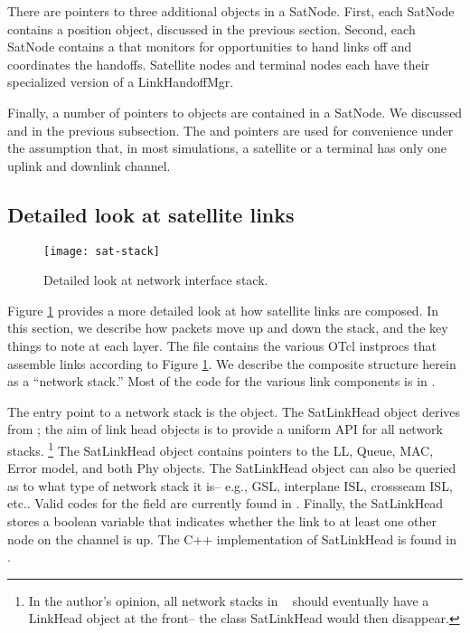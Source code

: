There are pointers to three additional objects in a SatNode.  First,
each SatNode contains a position object, discussed in the previous section.
Second, each SatNode contains a  that monitors
for opportunities to hand links off and coordinates the handoffs.  Satellite
nodes and terminal nodes each have their specialized version of a 
LinkHandoffMgr.

Finally, a number of pointers to objects are contained in a SatNode.  We
discussed  and  in the previous 
subsection.  The  and  pointers are
used for convenience under the assumption that, in most simulations,
a satellite or a terminal has only one uplink and downlink channel.

\subsection{Detailed look at satellite links}
\begin{figure}
    \centerline{\texttt{[image: sat-stack]}}
    \caption{Detailed look at network interface stack.}
    \label{fig:sat-stack}
\end{figure}

Figure \ref{fig:sat-stack} provides a more detailed look at how satellite links
are composed.  In this section, we describe how packets move up and down
the stack, and the key things to note at each layer.  The file 
 contains the various OTcl instprocs that assemble
links according to Figure \ref{fig:sat-stack}.  We describe the composite
structure herein as a ``network stack.''  Most of the code for the
various link components is in .

The entry point to a network stack is the  object.  The
SatLinkHead object derives from ; the aim of link
head objects is to provide a uniform API for all network stacks.
\footnote{In the author's opinion, all network stacks in \ns~ should 
eventually have a LinkHead object at the front-- the class SatLinkHead 
would then disappear.}  The SatLinkHead object contains pointers to
the LL, Queue, MAC, Error model, and both Phy objects.  The SatLinkHead
object can also be queried as to what type of network stack it is-- e.g.,
GSL, interplane ISL, crossseam ISL, etc..  Valid codes for the  
field are currently found in .  Finally, the SatLinkHead
stores a boolean variable  that indicates whether
the link to at least one other node on the channel is up.  The C++
implementation of SatLinkHead is found in .

